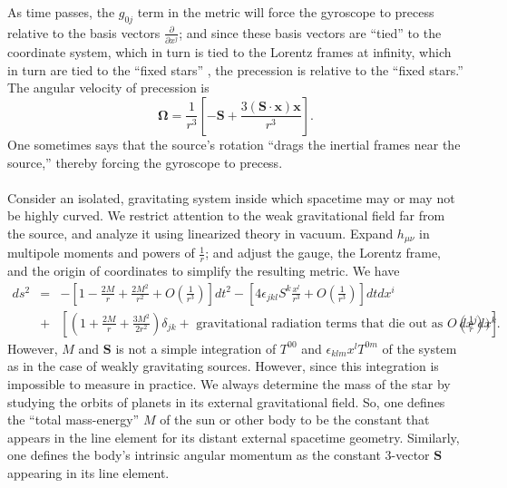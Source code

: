 As time passes, the $g_{0j}$ term in the metric will force the gyroscope to precess relative to the basis vectors $\frac{\partial}{\partial x^j}$; and since these basis vectors are ``tied'' to the coordinate system, which
in turn is tied to the Lorentz frames at infinity, which in turn are tied to the ``fixed stars'' , the precession is relative to the ``fixed stars.'' 
The angular velocity of precession is
\[\bm{\Omega} = \frac{1}{r^3} \left[ -\bm{S} + \frac{3(\bm{S}\cdot \bm{x})\bm{x}}{r^3} \right] .\]
One sometimes says that the source's rotation ``drags the inertial frames near the source,'' thereby forcing the gyroscope to precess.
\\ \\
Consider an isolated, gravitating system inside which spacetime may or may not be highly curved. We restrict attention to the weak gravitational field far from the source, and analyze it using linearized theory in vacuum.
Expand $h_{\mu\nu}$ in multipole moments and powers of $\frac{1}{r}$; and adjust the gauge, the Lorentz frame, and the origin of coordinates to simplify the resulting metric.
We have
\begin{eqnarray}
ds^2 &=& -\left[1-\frac{2M}{r} + \frac{2M^2}{r^2} + O(\frac{1}{r^3}) \right]dt^2 - \left[4\epsilon_{jkl}S^k \frac{x^l}{r^3} + O(\frac{1}{r^3})  \right] dtdx^i  \nonumber \\
&+& \left[(1+\frac{2M}{r} + \frac{3M^2}{2r^2})\delta_{jk} + \mbox{ gravitational radiation terms that die out as } O(\frac{1}{r}) ) \right]dx^j dx^k. \nonumber
\end{eqnarray}
However, $M$ and $\bm{S}$ is not a simple integration of $T^{00}$ and $\epsilon_{klm} x^l T^{0m}$ of the system as in the case of weakly gravitating sources.
However, since this integration is impossible to measure in practice. We always determine the mass of the star by studying the orbits of planets in its external gravitational field. So, one defines the ``total mass-energy'' $M$ of the sun or other body to be the constant that appears in the line element for its distant external spacetime geometry. Similarly, one defines the body's intrinsic angular momentum as the constant 3-vector $\bm{S}$ appearing in its line element.

